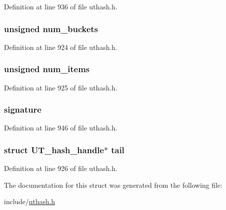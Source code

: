 Definition at line 936 of file uthash.\+h.

\subsubsection[{\texorpdfstring{num\+\_\+buckets}{num_buckets}}]{\setlength{\rightskip}{0pt plus 5cm}unsigned num\+\_\+buckets}\hypertarget{struct_u_t__hash__table_a5f0f25a07827aacb7af4ba2fc4afb5fe}{}\label{struct_u_t__hash__table_a5f0f25a07827aacb7af4ba2fc4afb5fe}


Definition at line 924 of file uthash.\+h.

\subsubsection[{\texorpdfstring{num\+\_\+items}{num_items}}]{\setlength{\rightskip}{0pt plus 5cm}unsigned num\+\_\+items}\hypertarget{struct_u_t__hash__table_a0f665ec9c648f93c0c529372051e79e7}{}\label{struct_u_t__hash__table_a0f665ec9c648f93c0c529372051e79e7}


Definition at line 925 of file uthash.\+h.

\subsubsection[{\texorpdfstring{signature}{signature}}]{ signature}\hypertarget{struct_u_t__hash__table_acd2a6284879dded65f0b8daa7c68485a}{}\label{struct_u_t__hash__table_acd2a6284879dded65f0b8daa7c68485a}


Definition at line 946 of file uthash.\+h.

\subsubsection[{\texorpdfstring{tail}{tail}}]{\setlength{\rightskip}{0pt plus 5cm}struct {\bf U\+T\+\_\+hash\+\_\+handle}$\ast$ tail}\hypertarget{struct_u_t__hash__table_af2d4a4fd9335f9813df1ecd3d7124f24}{}\label{struct_u_t__hash__table_af2d4a4fd9335f9813df1ecd3d7124f24}


Definition at line 926 of file uthash.\+h.



The documentation for this struct was generated from the following file\+:\begin{DoxyCompactItemize}
\item 
include/\hyperlink{uthash_8h}{uthash.\+h}\end{DoxyCompactItemize}
